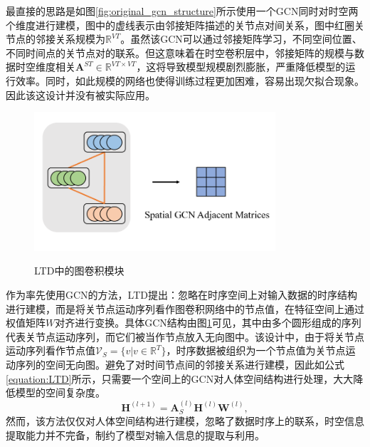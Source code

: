 最直接的思路是如图\ref{fig:original_gcn_structure}所示使用一个GCN同时对时空两个维度进行建模，图中的虚线表示由邻接矩阵描述的关节点对间关系，图中红圈关节点的邻接关系规模为$\mathbb{R}^{VT}$。虽然该GCN可以通过邻接矩阵学习，不同空间位置、不同时间点的关节点对的联系。但这意味着在时空卷积层中，邻接矩阵的规模与数据时空维度相关$\mathbf{A}^{ST} \in \mathbb{R}^{VT\times VT}$，这将导致模型规模剧烈膨胀，严重降低模型的运行效率。同时，如此规模的网络也使得训练过程更加困难，容易出现欠拟合现象。因此该这设计并没有被实际应用。

\begin{figure}[ht]
    \centering
    \includegraphics[width=0.8\textwidth]{FigMa/LTD_gcn.png}\\
    \vspace{-0.3cm}
    \caption{LTD中的图卷积模块}
    \label{fig:LTD_gcn_structure}
\end{figure}

作为率先使用GCN的方法，LTD提出：忽略在时序空间上对输入数据的时序结构进行建模，而是将关节点运动序列看作图卷积网络中的节点值，在特征空间上通过权值矩阵$W$对齐进行变换。具体GCN结构由图\ref{fig:LTD_gcn_structure}可见，其中由多个圆形组成的序列代表关节点运动序列，而它们被当作节点放入无向图中。该设计中，由于将关节点运动序列看作节点值$\mathcal{V}_S = \{v | v \in \mathbb{R}^{T} \}$，时序数据被组织为一个节点值为关节点运动序列的空间无向图。避免了对时间节点间的邻接关系进行建模，因此如公式\ref{equation:LTD}所示，只需要一个空间上的GCN对人体空间结构进行处理，大大降低模型的空间复杂度。
\begin{equation}
    \mathbf{H}^{(l+1)}= \mathbf{A}_{S}^{(l)}\mathbf{H}^{(l)}\mathbf{W}^{(l)},
    \label{equation:LTD}
\end{equation}
然而，该方法仅仅对人体空间结构进行建模，忽略了数据时序上的联系，时空信息提取能力并不完备，制约了模型对输入信息的提取与利用。

